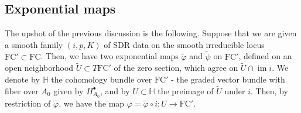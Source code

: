 \documentclass[11pt,a4paper]{amsart}
\theoremstyle{plain} %
\newtheorem{lem}[thm]{Lemma}
\newtheorem{cor}[thm]{Corollary}
\theoremstyle{definition}
\theoremstyle{remark}
\newcommand{\g}{\mathfrak{g}}
\newcommand{\im}{\operatorname{im}}
\newcommand{\til}{\widetilde}
\newcommand{\FC}{\mathrm{FC}}
\begin{document}
{\subsection{Exponential maps} \label{ssec: exp maps}
The upshot of the previous discussion is the following. Suppose that we are given a smooth family $(i,p,K)$ of SDR data  on the smooth irreducible locus $\FC' \subset \FC$. Then, we have two exponential maps 
    $\til{\varphi}$ and $\til{\psi}$ on $\FC'$, defined on an open neighborhood $\til{U} \subset T\FC'$ of the zero section, which agree on $\til{U} \cap \im i$. We denote by $\mathbb{H}$ the cohomology bundle over $\FC'$ - the graded vector bundle with fiber over $A_0$ given by $H^\bullet_{A_0}$, and by $U \subset \mathbb{H}$ the preimage of $\til{U}$ under $i$. Then, by restriction of $\til{\varphi}$, we have the map $\varphi = \til{\varphi} \circ i \colon U \to \FC'$. 
}
\end{document}
